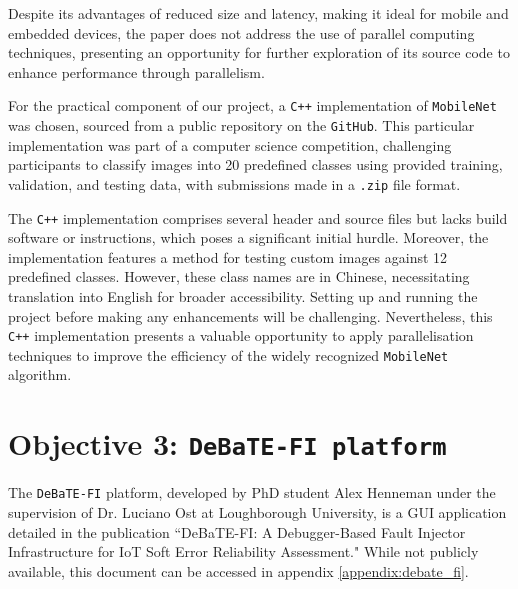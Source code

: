 Despite its advantages of reduced size and latency, making it ideal for mobile and embedded devices, the paper\cite{mobilenet_paper} does not address the use of parallel computing techniques, presenting an opportunity for further exploration of its source code to enhance performance through parallelism.

For the practical component of our project, a \texttt{C++} implementation of \texttt{MobileNet} was chosen, sourced from a public repository on the \texttt{GitHub}\cite{mobilenet_repo}. This particular implementation was part of a computer science competition\cite{mobilenet_competition}, challenging participants to classify images into 20 predefined classes using provided training, validation, and testing data, with submissions made in a \texttt{.zip} file format.

The \texttt{C++} implementation comprises several header and source files but lacks build software or instructions, which poses a significant initial hurdle. Moreover, the implementation features a method for testing custom images against 12 predefined classes. However, these class names are in Chinese, necessitating translation into English for broader accessibility. Setting up and running the project before making any enhancements will be challenging. Nevertheless, this \texttt{C++} implementation presents a valuable opportunity to apply parallelisation techniques to improve the efficiency of the widely recognized \texttt{MobileNet} algorithm.

\section{Objective 3: \texttt{DeBaTE-FI platform}}

The \texttt{DeBaTE-FI} platform, developed by PhD student Alex Henneman under the supervision of Dr. Luciano Ost at Loughborough University, is a GUI application detailed in the publication ``DeBaTE-FI: A Debugger-Based Fault Injector Infrastructure for IoT Soft Error Reliability Assessment." While not publicly available, this document can be accessed in appendix \ref{appendix:debate_fi}.

